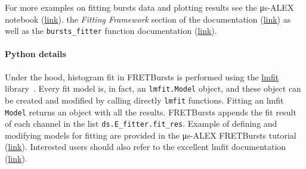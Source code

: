 For more examples on fitting bursts data and plotting results see the
μs-ALEX notebook (\href{http://nbviewer.jupyter.org/github/tritemio/FRETBursts_notebooks/blob/master/notebooks/FRETBursts%20-%20us-ALEX%20smFRET%20burst%20analysis.ipynb}{link}).
the \textit{Fitting Framework} section of the documentation 
(\href{http://fretbursts.readthedocs.org/en/latest/fit.html}{link})
as well as the \verb|bursts_fitter| function documentation
(\href{http://fretbursts.readthedocs.org/en/latest/plugins.html#fretbursts.burstlib_ext.bursts_fitter}{link}).

\paragraph{Python details}
Under the hood, histogram fit in FRETBursts is performed using the
\href{http://lmfit.github.io/lmfit-py/}{lmfit} library~\cite{lmfit}.
Every fit model is, in fact, an \verb|lmfit.Model| object, and these object
can be created and modified by calling directly \verb|lmfit| functions.
Fitting an lmfit \verb|Model| returns an object with all the results.
FRETBursts appends the fit result of each channel in the list 
\verb|ds.E_fitter.fit_res|.
Example of defining and modifying models for fitting are provided in 
the μs-ALEX FRETBursts tutorial (\href{http://nbviewer.jupyter.org/github/tritemio/FRETBursts_notebooks/blob/master/notebooks/FRETBursts%20-%20us-ALEX%20smFRET%20burst%20analysis.ipynb}{link}). 
Interested users should also refer to the excellent lmfit documentation
(\href{http://lmfit.github.io/lmfit-py/}{link}).
